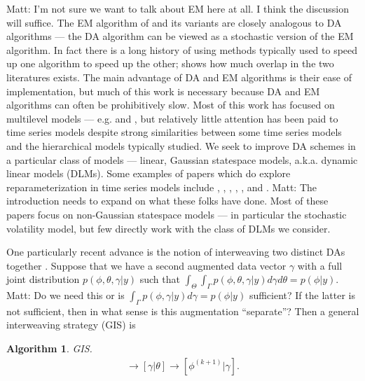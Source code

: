 \documentclass{article}
\newtheorem{alg}{Algorithm}
\newcommand{\matt}[1]{{\color{red} Matt: #1}}
\begin{document}
\matt{I'm not sure we want to talk about EM here at all. I think the discussion will suffice.}
The EM algorithm of \citet{dempster1977maximum} and its variants are closely analogous to DA algorithms --- the DA algorithm can be viewed as a stochastic version of the EM algorithm. In fact there is a long history of using methods typically used to speed up one algorithm to speed up the other; \citet{van2010cross} shows how much overlap in the two literatures exists. The main advantage of DA and EM algorithms is their ease of implementation, but much of this work is necessary because DA and EM algorithms can often be prohibitively slow. Most of this work has focused on multilevel models --- e.g. \citet{van2001art} and \citet{papaspiliopoulos2007general}, but relatively little attention has been paid to time series models despite strong similarities between some time series models and the hierarchical models typically studied. We seek to improve DA schemes in a particular class of models --- linear, Gaussian statespace models, a.k.a. dynamic linear models (DLMs). Some examples of papers which do explore reparameterization in time series models include \citet{strickland2008parameterisation}, \citet{fruhwirth2006auxiliary}, \citet{bos2006inference}, \citet{fruhwirth2008heston}, \citet{kastner2013ancillarity}, and \citet{fruhwirth2004efficient}. \matt{The introduction needs to expand on what these folks have done.}
Most of these papers focus on non-Gaussian statespace models --- in particular the stochastic volatility model, but few directly work with the class of DLMs we consider.

One particularly recent advance is the notion of interweaving two distinct DAs together \citep{yu2011center}. Suppose that we have a second augmented data vector $\gamma$ with a full joint distribution $p(\phi,\theta,\gamma|y)$ such that $\int_{\Theta}\int_{\Gamma}p(\phi,\theta,\gamma|y)d\gamma d\theta=p(\phi|y)$. \matt{Do we need this or is $\int_{\Gamma}p(\phi,\gamma|y)d\gamma =p(\phi|y)$ sufficient? If the latter is not sufficient, then in what sense is this augmentation ``separate''?} Then a general interweaving strategy (GIS) is
\begin{alg}GIS.\label{alg:GISintro}
  \begin{align*}
    [\theta|\phi^{(k)}] \to [\gamma|\theta] \to [\phi^{(k+1)}|\gamma].
  \end{align*}
\end{alg}
\end{document}

